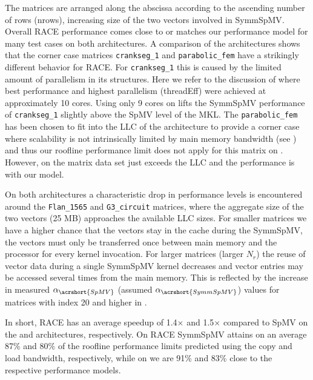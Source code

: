 The matrices are arranged along the abscissa according to the ascending number of rows (\acrshort{nrows}), \ie increasing size of the two vectors involved in \acrshort{SymmSpMV}. Overall \acrshort{RACE}  performance comes close to or matches our performance model for many test cases on both architectures. 
A comparison of the architectures shows that the corner case matrices \texttt{crankseg\_1} and \texttt{parabolic\_fem} have a strikingly different behavior for \acrshort{RACE}. For \texttt{crankseg\_1} this is caused by the limited amount of parallelism in its structures. Here we refer to the discussion of  where best performance and highest parallelism (\acrshort{threadEff}) were achieved at approximately 10 cores. Using only 9 cores on \SKX lifts the \acrshort{SymmSpMV} performance of  \texttt{crankseg\_1} slightly above the \acrshort{SpMV} level of the MKL. The \texttt{parabolic\_fem} has been chosen to fit into the \acrshort{LLC} of the \SKX architecture to provide a corner case where scalability is not intrinsically limited by main memory bandwidth (see  ) and thus our roofline performance limit does not apply for this matrix on \SKX. However, on \IVB the matrix data set just exceeds the LLC and the performance is   with our model. 

On both architectures a characteristic drop in performance levels is encountered around the \texttt{Flan\_1565} and \texttt{G3\_circuit} matrices, where the aggregate size of the two vectors (25 MB) approaches the available LLC sizes. For smaller matrices we have a higher chance that the vectors stay in the cache during the \acrshort{SymmSpMV}, \ie the vectors must only be transferred once between main memory and the processor for every kernel invocation. 
For larger matrices (\ie larger $N_r$) the reuse of vector data during a single \acrshort{SymmSpMV} kernel decreases and vector entries may be accessed several times from the main memory. This is reflected by the increase in measured $\alpha_{\acrshort{SpMV}}$ (assumed $\alpha_{\acrshort{SymmSpMV}}$) values for matrices with index 20 and higher in . 

In short, \acrshort{RACE} has an average speedup of 1.4$\times$ and 1.5$\times$ compared to \acrshort{SpMV} on the \SKX and \IVB architectures, respectively. On \SKX \acrshort{RACE} \acrshort{SymmSpMV} attains on an average 87\% and 80\% of the roofline performance limits predicted using the copy and load bandwidth, respectively, while on \IVB we are 91\% and 83\% close to the respective performance models.

